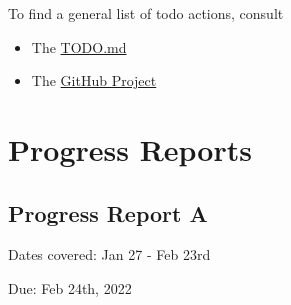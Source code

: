 \documentclass[sigplan,screen]{format/acmart}
\begin{document}
{To find a general list of todo actions, consult

\begin{itemize}
\item The \href{https://github.com/cybertraining-dsc/capstone-eartquake/blob/main/TODO.md}{TODO.md} 
\item The \href{https://github.com/Data-ScienceHub/mlcommons-science/projects/1}{GitHub Project}
\end{itemize}

\section{Progress Reports}

\subsection{Progress Report A}

Dates covered: Jan 27 - Feb 23rd

Due: Feb 24th, 2022

}
\end{document}
